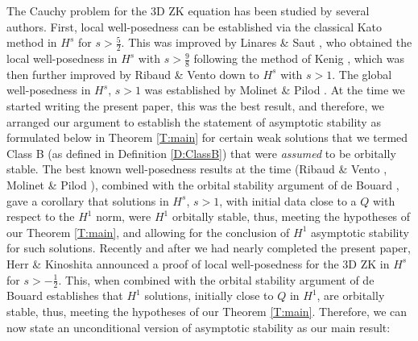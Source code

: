 \documentclass[12pt,letterpaper]{amsart}
\theoremstyle{remark}
\numberwithin{equation}{section}
\numberwithin{theorem}{section}
\numberwithin{table}{section}
\begin{document}
The Cauchy problem for the 3D ZK equation has been studied by several authors.  First,  local well-posedness can be established via the classical Kato method in $H^s$ for $s>\frac52$.  This was improved by Linares \&  Saut  \cite{LS}, who obtained the local well-posedness in $H^s$ with $s>\frac98$ following the method of Kenig \cite{K2004}, which was then further improved by Ribaud \& Vento \cite{RV} down to $H^s$ with $s>1$.  The global well-posedness in  $H^s$, $s>1$ was established by Molinet \& Pilod \cite{MP}.   At the time we started writing the present paper, this was the best result, and therefore, we arranged our argument to establish the statement of asymptotic stability as formulated below in Theorem \ref{T:main}  for certain weak solutions that we termed Class B (as defined in Definition \ref{D:ClassB}) that were \emph{assumed} to be orbitally stable.  The best known well-posedness results at the time (Ribaud \& Vento \cite{RV}, Molinet \& Pilod \cite{MP}), combined with the orbital stability argument of de Bouard \cite{deB}, gave a corollary that solutions in $H^s$, $s>1$, with initial data close to a $Q$ with respect to the $H^1$ norm, were $H^1$ orbitally stable, thus, meeting the hypotheses of our Theorem \ref{T:main}, and allowing for the conclusion of $H^1$ asymptotic stability for such solutions.   Recently and after we had nearly completed the present paper, Herr \& Kinoshita \cite{HK} announced a proof of local well-posedness for the 3D ZK in $H^s$ for $s>-\frac12$.  This, when combined with the orbital stability argument of de Bouard \cite{deB} establishes that $H^1$ solutions, initially close to $Q$ in $H^1$, are orbitally stable, thus, meeting the hypotheses of our Theorem \ref{T:main}.  Therefore, we can now state an unconditional version of asymptotic stability as our main result:
\end{document}
